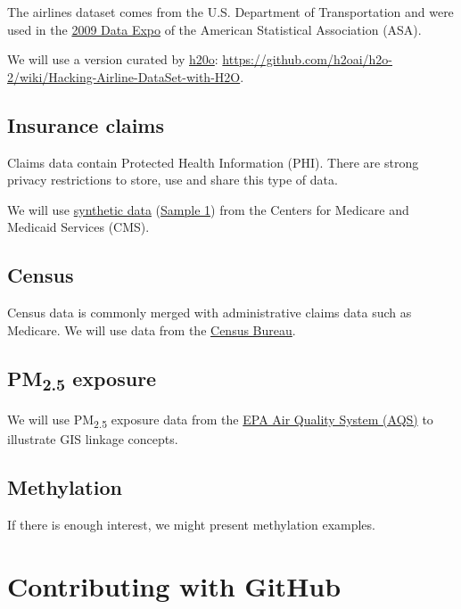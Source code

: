 \documentclass[]{book}
\theoremstyle{definition}
\theoremstyle{definition}
\theoremstyle{definition}
\theoremstyle{remark}
\begin{document}
The airlines dataset comes from the U.S. Department of Transportation
and were used in the
\href{http://stat-computing.org/dataexpo/2009/}{2009 Data Expo} of the
American Statistical Association (ASA).

We will use a version curated by \href{https://www.h2o.ai/}{h20o}:
\url{https://github.com/h2oai/h2o-2/wiki/Hacking-Airline-DataSet-with-H2O}.

\subsection{Insurance claims}\label{insurance-claims}

Claims data contain Protected Health Information (PHI). There are strong
privacy restrictions to store, use and share this type of data.

We will use
\href{https://www.cms.gov/Research-Statistics-Data-and-Systems/Downloadable-Public-Use-Files/SynPUFs/DE_Syn_PUF.html}{synthetic
data}
(\href{https://www.cms.gov/Research-Statistics-Data-and-Systems/Downloadable-Public-Use-Files/SynPUFs/DESample01.html}{Sample
1}) from the Centers for Medicare and Medicaid Services (CMS).

\subsection{Census}\label{census}

Census data is commonly merged with administrative claims data such as
Medicare. We will use data from the
\href{https://www.census.gov/data.html}{Census Bureau}.

\subsection{\texorpdfstring{PM\textsubscript{2.5}
exposure}{PM2.5 exposure}}\label{pm2.5-exposure}

We will use PM\textsubscript{2.5} exposure data from the
\href{https://www.epa.gov/aqs}{EPA Air Quality System (AQS)} to
illustrate GIS linkage concepts.

\subsection{Methylation}\label{methylation}

If there is enough interest, we might present methylation examples.

\section{Contributing with GitHub}\label{contributing-with-github}
\end{document}
